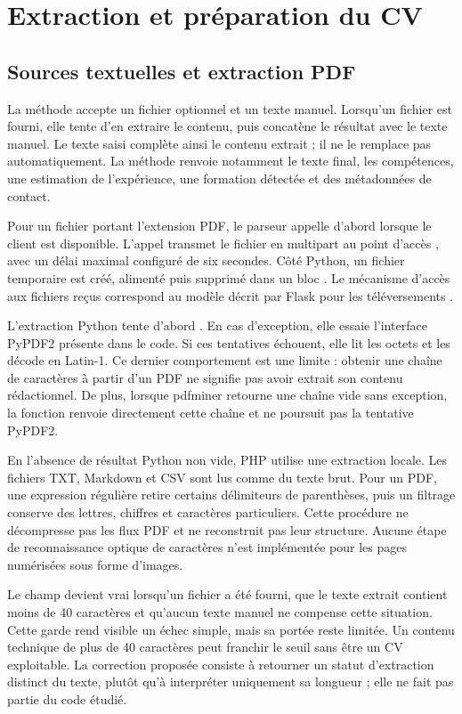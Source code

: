 \section{Extraction et préparation du CV}

\subsection{Sources textuelles et extraction PDF}

La méthode  accepte un fichier optionnel et un texte manuel. Lorsqu'un fichier est fourni, elle tente d'en extraire le contenu, puis concatène le résultat avec le texte manuel. Le texte saisi complète ainsi le contenu extrait ; il ne le remplace pas automatiquement. La méthode renvoie notamment le texte final, les compétences, une estimation de l'expérience, une formation détectée et des métadonnées de contact.

Pour un fichier portant l'extension PDF, le parseur appelle d'abord  lorsque le client est disponible. L'appel transmet le fichier en multipart au point d'accès , avec un délai maximal configuré de six secondes. Côté Python, un fichier temporaire est créé, alimenté puis supprimé dans un bloc . Le mécanisme d'accès aux fichiers reçus correspond au modèle décrit par Flask pour les téléversements \cite{flask-docs}.

L'extraction Python tente d'abord . En cas d'exception, elle essaie l'interface PyPDF2 présente dans le code. Si ces tentatives échouent, elle lit les octets et les décode en Latin-1. Ce dernier comportement est une limite : obtenir une chaîne de caractères à partir d'un PDF ne signifie pas avoir extrait son contenu rédactionnel. De plus, lorsque pdfminer retourne une chaîne vide sans exception, la fonction renvoie directement cette chaîne et ne poursuit pas la tentative PyPDF2.

En l'absence de résultat Python non vide, PHP utilise une extraction locale. Les fichiers TXT, Markdown et CSV sont lus comme du texte brut. Pour un PDF, une expression régulière retire certains délimiteurs de parenthèses, puis un filtrage conserve des lettres, chiffres et caractères particuliers. Cette procédure ne décompresse pas les flux PDF et ne reconstruit pas leur structure. Aucune étape de reconnaissance optique de caractères n'est implémentée pour les pages numérisées sous forme d'images.

Le champ  devient vrai lorsqu'un fichier a été fourni, que le texte extrait contient moins de 40 caractères et qu'aucun texte manuel ne compense cette situation. Cette garde rend visible un échec simple, mais sa portée reste limitée. Un contenu technique de plus de 40 caractères peut franchir le seuil sans être un CV exploitable. La correction proposée consiste à retourner un statut d'extraction distinct du texte, plutôt qu'à interpréter uniquement sa longueur ; elle ne fait pas partie du code étudié.

